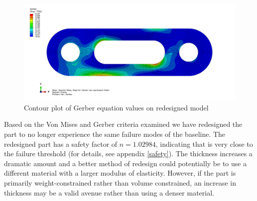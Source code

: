 \documentclass[../main.tex]{subfiles}
\begin{document}
\begin{figure}[H]
    \centering
    \includegraphics[scale=0.2]{../../images/40bush_30body_gerber.png}
    \caption{Contour plot of Gerber equation values on redesigned model}
    \label{redesigned_gerber}
\end{figure}

Based on the Von Mises and Gerber criteria examined we have redesigned the part to no longer experience the same failure modes of the baseline.
The redesigned part has a safety factor of \(n=1.02984\), indicating that is very close to the failure threshold (for details, see appendix \ref{safety}).
The thickness increases a dramatic amount and a better method of redesign could potentially be to use a different material with a larger modulus of elasticity.
However, if the part is primarily weight-constrained rather than volume constrained, an increase in thickness may be a valid avenue rather than using a denser material.
\end{document}
